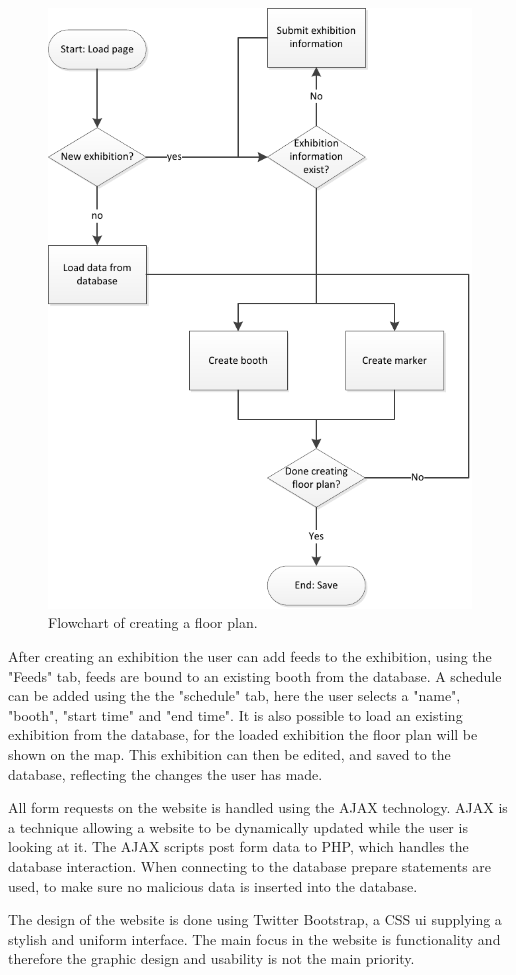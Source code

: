 \begin{figure}[H]
	\centering
	\includegraphics[width=0.7\linewidth]{img/floorplanflow.pdf}
	\caption{Flowchart of creating a floor plan.\label{fig:floorplan}}
\end{figure}

After creating an exhibition the user can add feeds to the exhibition, using the "Feeds" tab, feeds are bound to an existing booth from the database. A schedule can be added using the the "schedule" tab, here the user selects a "name", "booth", "start time" and "end time".
It is also possible to load an existing exhibition from the database, for the loaded exhibition the floor plan will be shown on the map. This exhibition can then be edited, and saved to the database, reflecting the changes the user has made.


All form requests on the website is handled using the AJAX technology\citep{ajax}. AJAX is a technique allowing a website to be dynamically updated while the user is looking at it.
The AJAX scripts post form data to PHP, which handles the database interaction. When connecting to the database prepare statements are used, to make sure no malicious data is inserted into the database.


The design of the website is done using Twitter Bootstrap\citep{twitterbootstrap}, a CSS \ac{ui} supplying a stylish and uniform interface.
The main focus in the website is functionality and therefore the graphic design and usability is not the main priority.